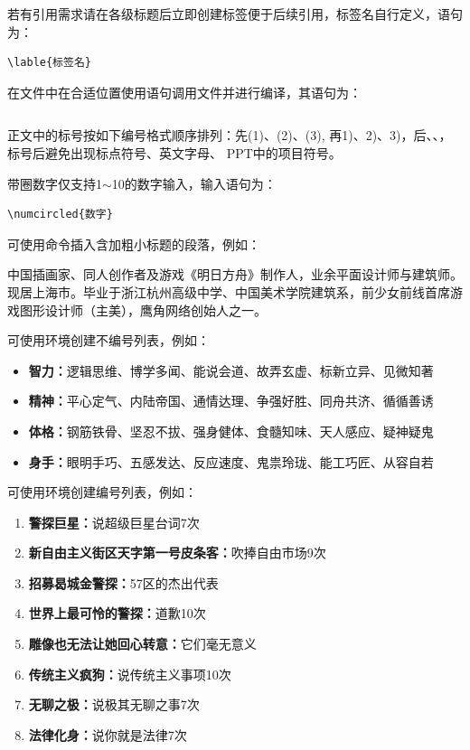 若有引用需求请在各级标题后立即创建标签便于后续引用，标签名自行定义，语句为：
\begin{lstlisting}[language={[LaTeX]TeX}]
\lable{标签名}
\end{lstlisting}


在文件中在合适位置使用语句调用文件并进行编译，其语句为：
\begin{lstlisting}[language={[LaTeX]TeX}]

\end{lstlisting}

正文中的标号按如下编号格式顺序排列：先(1)、(2)、(3), 再1)、2)、3)，后、、，标号后避免出现标点符号、英文字母、 PPT中的项目符号。

带圈数字仅支持1$\sim$10的数字输入，输入语句为：
\begin{lstlisting}[language={[LaTeX]TeX}]
\numcircled{数字}
\end{lstlisting}

可使用命令插入含加粗小标题的段落，例如：

 中国插画家、同人创作者及游戏《明日方舟》制作人，业余平面设计师与建筑师。现居上海市。毕业于浙江杭州高级中学、中国美术学院建筑系，前少女前线首席游戏图形设计师（主美），鹰角网络创始人之一。

可使用环境创建不编号列表，例如：

\begin{itemize}
    \item \textbf{智力：}逻辑思维、博学多闻、能说会道、故弄玄虚、标新立异、见微知著
    \item \textbf{精神：}平心定气、内陆帝国、通情达理、争强好胜、同舟共济、循循善诱
    \item \textbf{体格：}钢筋铁骨、坚忍不拔、强身健体、食髓知味、天人感应、疑神疑鬼
    \item \textbf{身手：}眼明手巧、五感发达、反应速度、鬼祟玲珑、能工巧匠、从容自若
\end{itemize}

可使用环境创建编号列表，例如：

\begin{enumerate}
    \item \textbf{警探巨星：}说超级巨星台词7次
    \item \textbf{新自由主义街区天字第一号皮条客：}吹捧自由市场9次
    \item \textbf{招募曷城金警探：}57区的杰出代表
    \item \textbf{世界上最可怜的警探：}道歉10次
    \item \textbf{雕像也无法让她回心转意：}它们毫无意义
    \item \textbf{传统主义疯狗：}说传统主义事项10次
    \item \textbf{无聊之极：}说极其无聊之事7次
    \item \textbf{法律化身：}说你就是法律7次
\end{enumerate}


